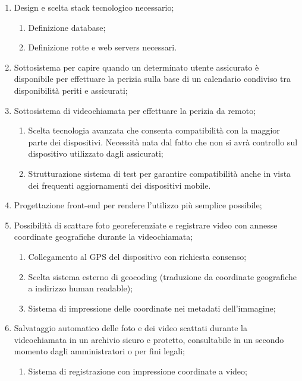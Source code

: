 \documentclass[a4paper,12pt, openright]{report}
\begin{document}
\begin{enumerate}
    \item Design e scelta stack tecnologico necessario;
    \begin{enumerate}
        \item Definizione database;
        \item Definizione rotte e web servers necessari.
    \end{enumerate}
    \item Sottosistema per capire quando un determinato utente assicurato è disponibile per effettuare la perizia sulla base di un calendario condiviso tra disponibilità periti e assicurati;
    \item Sottosistema di videochiamata per effettuare la perizia da remoto;
    \begin{enumerate}
        \item Scelta tecnologia avanzata che consenta compatibilità con la maggior parte dei dispositivi. Necessità nata dal fatto che non si avrà controllo sul dispositivo utilizzato dagli assicurati;
        \item Strutturazione sistema di test per garantire compatibilità anche in vista dei frequenti aggiornamenti dei dispositivi mobile.
    \end{enumerate}
    \item Progettazione front-end per rendere l'utilizzo più semplice possibile;
    \item Possibilità di scattare foto georeferenziate e registrare video con annesse coordinate geografiche durante la videochiamata;
    \begin{enumerate}
        \item Collegamento al GPS del dispositivo con richiesta consenso;
        \item Scelta sistema esterno di geocoding (traduzione da coordinate geografiche a indirizzo human readable);
        \item Sistema di impressione delle coordinate nei metadati dell'immagine;
    \end{enumerate}
    \item Salvataggio automatico delle foto e dei video scattati durante la videochiamata in un archivio sicuro e protetto, consultabile in un secondo momento dagli amministratori o per fini legali;
    \begin{enumerate}
        \item Sistema di registrazione con impressione coordinate a video;
    \end{enumerate}
\end{enumerate}
\end{document}
